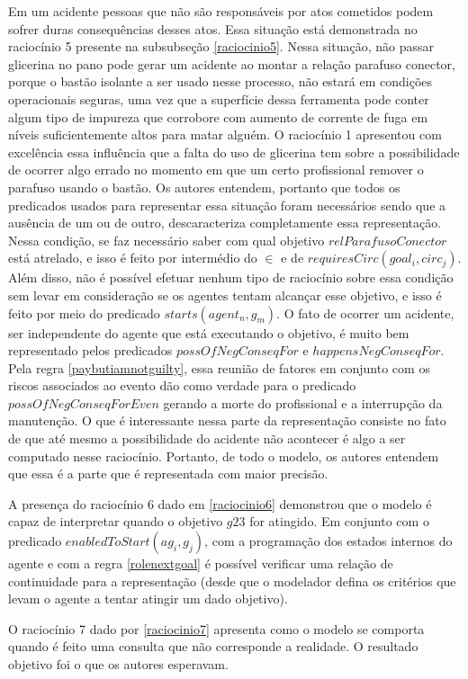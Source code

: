 Em um acidente pessoas que não são responsáveis por atos cometidos podem sofrer duras consequências desses atos. Essa situação está demonstrada no raciocínio 5 presente na subsubseção \ref{raciocinio5}. Nessa situação, não passar glicerina no pano pode gerar um acidente ao montar a relação parafuso conector, porque o bastão isolante a ser usado nesse  processo, não estará em condições operacionais seguras, uma vez que a superfície dessa ferramenta pode conter algum tipo de impureza que corrobore com aumento de corrente de fuga em níveis suficientemente altos para matar alguém. O raciocínio 1 apresentou com excelência essa influência que a falta do uso de glicerina tem sobre a possibilidade de ocorrer algo errado no momento em que um certo profissional remover o parafuso usando o bastão. Os autores entendem, portanto que todos os predicados usados para representar essa situação foram necessários sendo que a ausência de um ou de outro, descaracteriza completamente essa representação. Nessa condição, se faz necessário saber com qual objetivo $relParafusoConector$ está atrelado, e isso é feito por intermédio do $\in$ e de $requiresCirc(goal_i,circ_j)$. Além disso, não é possível efetuar nenhum tipo de raciocínio sobre essa condição sem levar em consideração se os agentes tentam alcançar esse objetivo, e isso é feito por meio do predicado $starts(agent_n,g_m)$. O fato de ocorrer um acidente, ser independente do agente que está executando o objetivo, é muito bem representado pelos predicados $possOfNegConseqFor$ e $happensNegConseqFor$. Pela regra \ref{paybutiamnotguilty}, essa reunião de fatores em conjunto com os riscos associados ao evento dão como verdade para o predicado $possOfNegConseqForEven$ gerando a morte do profissional e a interrupção da manutenção. O que é interessante nessa parte da representação consiste no fato de que até mesmo a possibilidade do acidente não acontecer é algo a ser computado nesse raciocínio. Portanto, de todo o modelo, os autores entendem que essa é a parte que é representada com maior precisão. 

A presença do raciocínio 6 dado em \ref{raciocinio6} demonstrou que o modelo é capaz de interpretar quando o objetivo $g23$ for atingido. Em conjunto com o predicado $enabledToStart(ag_i,g_j)$, com a programação dos estados internos do agente e com a regra \ref{rolenextgoal} é possível verificar uma relação de continuidade para a representação (desde que o modelador defina os critérios que levam o agente a tentar atingir um dado objetivo). 

O raciocínio 7 dado por \ref{raciocinio7} apresenta como o modelo se comporta quando é feito uma consulta que não corresponde a realidade. O resultado objetivo foi o que os autores esperavam. 

